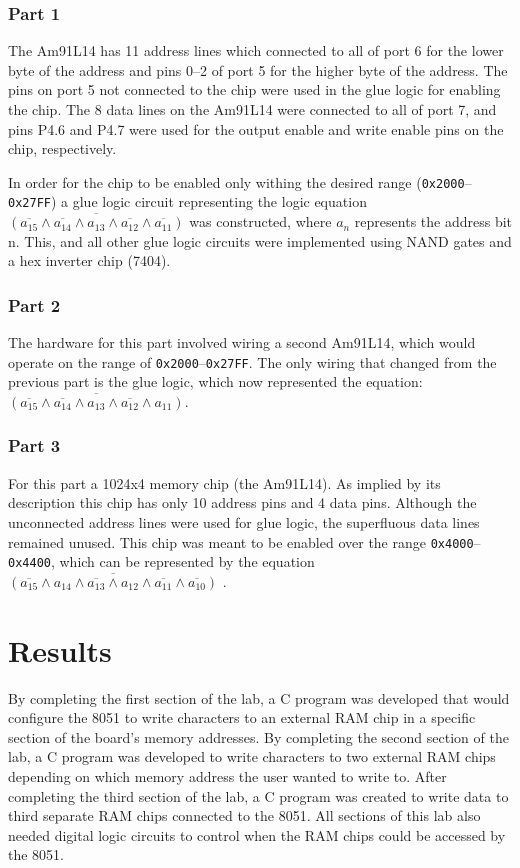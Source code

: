 \documentclass[12pt]{article}
\begin{document}
\subsubsection{Part 1}
The Am91L14 has 11 address lines which connected to all of port 6 for the lower byte of the address and pins 0--2 of port 5 for the higher byte of the address. The pins on port 5 not connected to the chip were used in the glue logic for enabling the chip. The 8 data lines on the Am91L14 were connected to all of port 7, and pins P4.6 and P4.7 were used for the output enable and write enable pins on the chip, respectively. 

In order for the chip to be enabled only withing the desired range (\texttt{0x2000}--\texttt{0x27FF}) a glue logic circuit representing the logic equation $\overline{(\overline{a_{15}}\land\overline{a_{14}}\land a_{13}\land\overline{a_{12}}\land\overline{a_{11}})}$ was constructed, where $a_n$ represents the address bit n. This, and all other glue logic circuits were implemented using NAND gates and a hex inverter chip (7404).

\subsubsection{Part 2}
The hardware for this part involved wiring a second Am91L14, which would operate on the range of \texttt{0x2000}--\texttt{0x27FF}. The only wiring that changed from the previous part is the glue logic, which now represented the equation: $\overline{(\overline{a_{15}}\land\overline{a_{14}}\land a_{13}\land\overline{a_{12}}\land a_{11})}$.

\subsubsection{Part 3}
For this part a 1024x4 memory chip (the Am91L14). As implied by its description this chip has only 10 address pins and 4 data pins. Although the unconnected address lines were used for glue logic, the superfluous data lines remained unused. This chip was meant to be enabled over the range \texttt{0x4000}--\texttt{0x4400}, which can be represented by the equation  $\overline{(\overline{a_{15}}\land a_{14}\land \overline{a_{13}}\land a_{12}\land\overline{a_{11}}\land\overline{a_{10}})}$ .

\section{Results}
By completing the first section of the lab, a C program was developed that would configure the 8051 to write characters to an external RAM chip in a specific section of the board’s memory addresses. By completing the second section of the lab, a C program was developed to write characters to two external RAM chips depending on which memory address the user wanted to write to. After completing the third section of the lab, a C program was created to write data to third separate RAM chips connected to the 8051. All sections of this lab also needed digital logic circuits to control when the RAM chips could be accessed by the 8051. 
\end{document}
